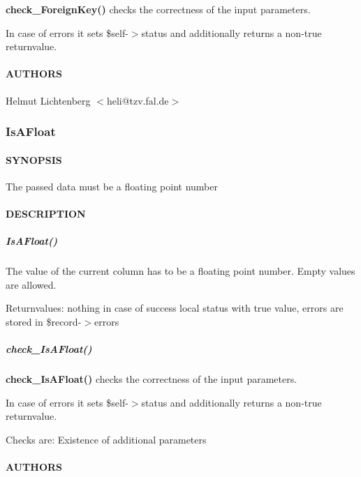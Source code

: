 \textbf{check\_ForeignKey()} checks the correctness of the input parameters.



In case of errors it sets \$self-$>$status and additionally returns a non-true
returnvalue.

\paragraph*{AUTHORS\label{ForeignKey_AUTHORS}}


Helmut Lichtenberg $<$heli@tzv.fal.de$>$

\subsubsection{IsAFloat\label{IsAFloat}}




\paragraph*{SYNOPSIS\label{IsAFloat_SYNOPSIS}}


The passed data must be a floating point number

\paragraph*{DESCRIPTION\label{IsAFloat_DESCRIPTION}}
\subparagraph*{IsAFloat()\label{IsAFloat_IsAFloat_}}


The value of the current column has to be a floating point number.  Empty
values are allowed.



Returnvalues:
   nothing in case of success
   local status with true value, errors are stored in \$record-$>$errors

\subparagraph*{check\_IsAFloat()\label{IsAFloat_check_IsAFloat_}}


\textbf{check\_IsAFloat()} checks the correctness of the input parameters.



In case of errors it sets \$self-$>$status and additionally returns a non-true
returnvalue.



Checks are:
   Existence of additional parameters

\paragraph*{AUTHORS\label{IsAFloat_AUTHORS}}


